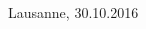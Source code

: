 \documentclass[12pt,a4paper,oneside]{article}
\newcommand{\english}{    \switchcolumn[0]\noindent}
\begin{document}
\begin{paracol}{2}
\english
	\vspace{\fill}
	
	\noindent
	Lausanne, 30.10.2016
	\vspace {1.5cm}

	\noindent
	\hrulefill \\
 
	\vspace {1.0cm}
 	\noindent 
 	\hrulefill \\
 	

 	

	
	

\clearpage

% 



\end{paracol}
\end{document}
